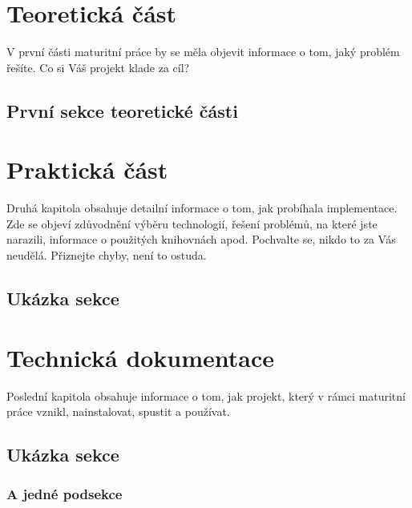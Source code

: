 \documentclass[12pt,a4paper,twoside,openright]{report}
\begin{document}


\setcounter{tocdepth}{2}
\tableofcontents

\chapter{Teoretická část}
\pagestyle{fancy}

V první části maturitní práce by se měla objevit informace o tom, jaký problém řešíte. Co si Váš projekt klade za cíl?

\section{První sekce teoretické části}

\lipsum

\chapter{Praktická část}

Druhá kapitola obsahuje detailní informace o tom, jak probíhala implementace. Zde se objeví zdůvodnění výběru technologií, řešení problémů, na které jste narazili, informace o použitých knihovnách apod. Pochvalte se, nikdo to za Vás neudělá. Přiznejte chyby, není to ostuda.

\section{Ukázka sekce}

\lipsum

\chapter{Technická dokumentace}

Poslední kapitola obsahuje informace o tom, jak projekt, který v rámci maturitní práce vznikl, nainstalovat, spustit a používat.

\section{Ukázka sekce}

\lipsum[5]

\subsection{A jedné podsekce}

\lipsum
\end{document}
